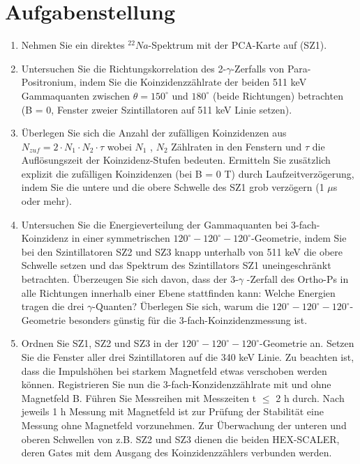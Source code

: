 \section{Aufgabenstellung}

\begin{enumerate}
\item Nehmen Sie ein direktes $^{22}Na$-Spektrum mit der PCA-Karte auf (SZ1). 
\item Untersuchen Sie die Richtungskorrelation des 2-$\gamma$-Zerfalls von Para-Positronium, indem Sie die Koinzidenzzählrate der beiden 511 keV Gammaquanten zwischen $\theta = 150^{\circ}$ und $180^{\circ}$  (beide Richtungen) betrachten (B = 0, Fenster zweier Szintillatoren auf 511 keV Linie setzen). 
\item Überlegen Sie sich die Anzahl der zufälligen Koinzidenzen aus $N_{zuf} = 2\cdot N_1\cdot N_2 \cdot \tau$ wobei $N_1$ , $N_2$ Zählraten in den Fenstern und $\tau$ die Auflösungszeit der Koinzidenz-Stufen bedeuten. Ermitteln Sie zusätzlich explizit die zufälligen Koinzidenzen (bei B = 0 T) durch Laufzeitverzögerung, indem Sie die untere und die obere Schwelle des SZ1 grob verzögern (1 $\mu$s oder mehr). 
\item Untersuchen Sie die Energieverteilung der Gammaquanten bei 3-fach-Koinzidenz in einer symmetrischen $120^{\circ}-120^{\circ}-120^{\circ}$-Geometrie, indem Sie bei den Szintillatoren SZ2 und SZ3 knapp unterhalb 
von 511 keV die obere Schwelle setzen und das Spektrum des Szintillators SZ1 uneingeschränkt betrachten. Überzeugen Sie sich davon, dass der 3-$\gamma$ -Zerfall des Ortho-Ps in alle Richtungen innerhalb einer Ebene stattfinden kann: Welche Energien tragen die drei $\gamma$-Quanten? Überlegen Sie sich, warum die $120^{\circ}-120^{\circ}-120^{\circ}$-Geometrie besonders günstig für die 3-fach-Koinzidenzmessung 
ist.
\item Ordnen Sie SZ1, SZ2 und SZ3 in der $120^{\circ}-120^{\circ}-120^{\circ}$-Geometrie an. Setzen Sie die Fenster aller drei Szintillatoren auf die 340 keV Linie. Zu beachten ist, dass die Impulshöhen bei starkem Magnetfeld etwas verschoben werden können. Registrieren Sie nun die 3-fach-Konzidenzzählrate mit und ohne Magnetfeld B. Führen Sie Messreihen mit Messzeiten t $\leq$ 2 h durch. Nach jeweils 1 h Messung mit Magnetfeld ist zur Prüfung der Stabilität eine Messung ohne Magnetfeld vorzunehmen. Zur Überwachung der unteren und oberen Schwellen von z.B. SZ2 und SZ3 dienen die beiden HEX-SCALER, deren Gates mit dem Ausgang des Koinzidenzzählers verbunden werden. 
\end{enumerate}

\clearpage